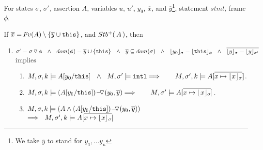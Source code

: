 \begin{lemma}
\label{l:calls:old}
For states $\sigma$, $\sigma'$, assertion $A$, %
variables  $u$, $u'$, $y_0$, $\overline{x}$, and  $\overline{y}$\footnote{We take $\overline y$ to stand for $y_1, ... y_n$}, statement $stmt$, frame $\phi$.

$ ~ $ %
\\
If 
 $\overline{x}=\fv(A)\setminus\{ {\overline{y}} \cup \prg{this} \}$, and 
 $ \Pos A$, then
  
\begin{enumerate}

\item
\label{l:calls:callee}
$\sigma'=\sigma  \pushSymbol \phi \ \ \wedge \ \  dom(\phi)=\overline{y}\cup \{ \prg{this} \}\ \ \wedge\ \ 
\overline{y} \subseteq dom(\sigma)\ \  \wedge\ \
\interpret \sigma {y_0} = \interpret \phi {\prg{this}}\ \ \wedge \ \ 
\overline{ {\interpret \sigma y}= {\interpret {\sigma'} y}}$\\
implies

\begin{enumerate}
\item
\label{l:calls:callee:one}
$\satDAssertFrom M  \sigma k   A[y_0/\prg{this}] \ \    \wedge\ \ M, \sigma' \models \intThis  
 \hfill  \Longrightarrow\ \ \ \ \  \ \satDAssertFrom M  {\sigma'} k   A[\overline {x \mapsto {\interpret \sigma x}}]$.

\item
\label{l:calls:callee:two}
$\satDAssertFrom M  \sigma k   {\PushASLong  {(y_0,\overline{y})} {( A[y_0/\prg{this}])}}
\hfill \Longrightarrow\ \ \ \ \ \ M,  {\sigma'} \models   A[\overline {x \mapsto {\interpret \sigma x}}]$.

\item
\label{l:calls:callee:three}
$\satDAssertFrom M  \sigma k   {(A \wedge \PushASLong  {(y_0,\overline{y})} {( A[y_0/\prg{this}])})}$\\  
$\Longrightarrow\ \  \satDAssertFrom M  {\sigma'} k   A[\overline {x \mapsto {\interpret \sigma x}}]$



\end{enumerate}
\end{enumerate}
\end{lemma}
